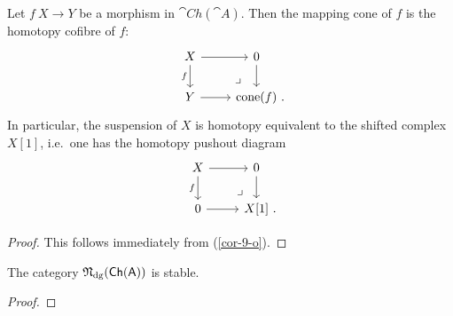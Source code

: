 \begin{proposition}
    Let $f\:X\to Y$ be a morphism in $\cat{Ch}(\cat{A})$.
    Then the mapping cone of $f$ is the homotopy cofibre of $f$:
    \[\begin{tikzcd}
        X\ar[r]\ar[d,"f"']\ar[dr,phantom,pos=.75,"\lrcorner",end anchor={[xshift=-.5em]north}] & 0\ar[d] \\
        Y\ar[r] & \operatorname{cone}(f)\rlap{\ .}
    \end{tikzcd}\]
    In particular, the suspension of $X$ is homotopy equivalent to
    the shifted complex $X[1]$,
    i.e.\ one has the homotopy pushout diagram
    \[\begin{tikzcd}
        X\ar[r]\ar[d,"f"']\ar[dr,phantom,pos=.75,"\lrcorner",end anchor={[xshift=-.5em]north}] & 0\ar[d] \\
        0\ar[r] & X[1]\rlap{\ .}
    \end{tikzcd}\]
\end{proposition}

\begin{proof}
    This follows immediately from (\ref{cor-9-o}).
\end{proof}

\begin{theorem}
    The category $\mathfrak{N}_{\mathrm{dg}}(\mathsf{Ch}(\mathsf{A}))$ is stable.
\end{theorem}

\begin{proof}
    \nyw
\end{proof}
